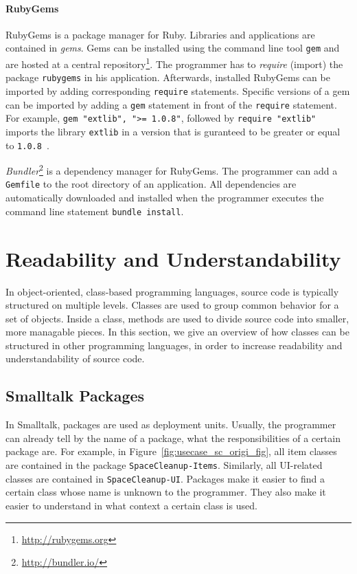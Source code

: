 \paragraph{RubyGems}
RubyGems is a package manager for Ruby. Libraries and applications are contained in \emph{gems}. Gems can be installed using the command line tool \texttt{gem} and are hosted at a central repository\footnote{\url{http://rubygems.org}}. The programmer has to \emph{require} (import) the package \texttt{rubygems} in his application. Afterwards, installed RubyGems can be imported by adding corresponding \texttt{require} statements. Specific versions of a gem can be imported by adding a \texttt{gem} statement in front of the \texttt{require} statement. For example, \texttt{gem "extlib", "\textgreater = 1.0.8"}, followed by \texttt{require "extlib"} imports the library \texttt{extlib} in a version that is guranteed to be greater or equal to \texttt{1.0.8}~\cite{rubygemsguide}. 

\emph{Bundler}\footnote{\url{http://bundler.io/}} is a dependency manager for RubyGems. The programmer can add a \texttt{Gemfile} to the root directory of an application. All dependencies are automatically downloaded and installed when the programmer executes the command line statement \texttt{bundle install}.

\section{Readability and Understandability}
In object-oriented, class-based programming languages, source code is typically structured on multiple levels. Classes are used to group common behavior for a set of objects. Inside a class, methods are used to divide source code into smaller, more managable pieces. In this section, we give an overview of how classes can be structured in other programming languages, in order to increase readability and understandability of source code.

\subsection{Smalltalk Packages}
In Smalltalk, packages are used as deployment units. Usually, the programmer can already tell by the name of a package, what the responsibilities of a certain package are. For example, in Figure~\ref{fig:usecase_sc_origi_fig}, all item classes are contained in the package \texttt{SpaceCleanup-Items}. Similarly, all UI-related classes are contained in \texttt{SpaceCleanup-UI}. Packages make it easier to find a certain class whose name is unknown to the programmer. They also make it easier to understand in what context a certain class is used.

